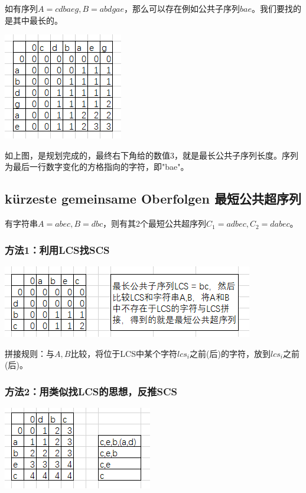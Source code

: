 \documentclass[a4paper]{article}    %
\begin{document}
如有序列$A=cdbaeg,B=abdgae$，那么可以存在例如公共子序列$bae$。我们要找的是其中最长的。

\begin{center}
    \includegraphics[scale=0.6]{37.png}
\end{center}

如上图，是规划完成的，最终右下角给的数值3，就是最长公共子序列长度。序列为最后一行数字变化的方格指向的字符，即"bae"。

\subsection{kürzeste gemeinsame Oberfolgen 最短公共超序列}

有字符串$A=abec,B=dbc$，则有其2个最短公共超序列$C_1=adbec,C_2=dabec$。

\subsubsection{方法1：利用LCS找SCS}

\begin{center}
    \includegraphics[scale=0.6]{38.png}
\end{center}

拼接规则：与$A,B$比较，将位于LCS中某个字符$lcs_i$之前(后)的字符，放到$lcs_i$之前(后)。

\subsubsection{方法2：用类似找LCS的思想，反推SCS}

\begin{center}
    \includegraphics[scale=0.6]{39.png}
\end{center}
\end{document}

